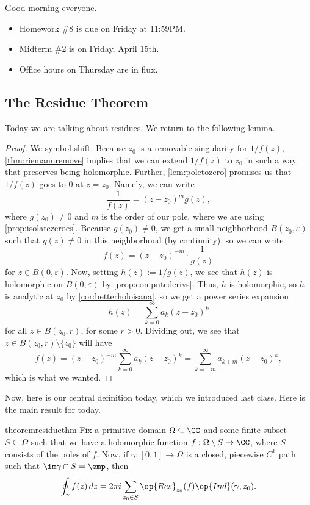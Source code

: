 
Good morning everyone.
\begin{itemize}
	\item Homework \#8 is due on Friday at 11:59PM.
	\item Midterm \#2 is on Friday, April 15th.
	\item Office hours on Thursday are in flux.
\end{itemize}

\subsection{The Residue Theorem}
Today we are talking about residues. We return to the following lemma.
\laurent*
\begin{proof}
	We symbol-shift. Because $z_0$ is a removable singularity for $1/f(z)$, \autoref{thm:riemannremove} implies that we can extend $1/f(z)$ to $z_0$ in such a way that preserves being holomorphic. Further, \autoref{lem:poletozero} promises us that $1/f(z)$ goes to $0$ at $z=z_0$. Namely, we can write
	\[\frac1{f(z)}=(z-z_0)^mg(z),\]
	where $g(z_0)\ne0$ and $m$ is the order of our pole, where we are using \autoref{prop:isolatezeroes}. Because $g(z_0)\ne0$, we get a small neighborhood $B(z_0,\varepsilon)$ such that $g(z)\ne0$ in this neighborhood (by continuity), so we can write
	\[f(z)=(z-z_0)^{-m}\cdot\frac1{g(z)}\]
	for $z\in B(0,\varepsilon)$. Now, setting $h(z):=1/g(z)$, we see that $h(z)$ is holomorphic on $B(0,\varepsilon)$ by \autoref{prop:computederivs}. Thus, $h$ is holomorphic, so $h$ is analytic at $z_0$ by \autoref{cor:betterholoisana}, so we get a power series expansion
	\[h(z)=\sum_{k=0}^\infty a_k(z-z_0)^k\]
	for all $z\in B(z_0,r)$, for some $r>0$. Dividing out, we see that $z\in B(z_0,r)\setminus\{z_0\}$ will have
	\[f(z)=(z-z_0)^{-m}\sum_{k=0}^\infty a_k(z-z_0)^k=\sum_{k=-m}^\infty a_{k+m}(z-z_0)^k,\]
	which is what we wanted.
\end{proof}
Now, here is our central definition today, which we introduced last class.
\resideudef*
\noindent Here is the main result for today.
\begin{restatable}[Residue]{theorem}{residuethm} \label{thm:residue}
	Fix a primitive domain $\Omega\subseteq\CC$ and some finite subset $S\subseteq\Omega$ such that we have a holomorphic function $f:\Omega\setminus S\to\CC$, where $S$ consists of the poles of $f$. Now, if $\gamma:[0,1]\to\Omega$ is a closed, piecewise $C^1$ path such that $\im\gamma\cap S=\emp$, then
	\[\oint_\gamma f(z)\,dz=2\pi i\sum_{z_0\in S}\op{Res}_{z_0}(f)\op{Ind}(\gamma,z_0).\]
\end{restatable}
